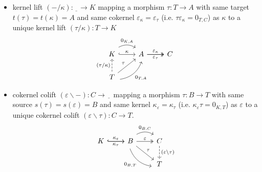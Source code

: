\begin{itemize}
\item kernel lift $(-/\kappa) : \underline{\phantom{T}} \rightarrow K$ mapping a morphism $\tau : T \rightarrow A$ with same
target $t(\tau) = t(\kappa) = A$ and same cokernel $\varepsilon_{\kappa} = \varepsilon_{\tau}$ (i.e. $\tau\varepsilon_{\kappa} = 0_{T,C}$)
as $\kappa$ to a unique kernel lift $(\tau / \kappa) : T \rightarrow K$
\[
\begin{tikzcd}
K \arrow[r, "\kappa", hook] \arrow[r, "{0_{K,A}}", bend left, shift left=2]                                & A \arrow[r, "\varepsilon_{\kappa}", two heads] \arrow[r, "\varepsilon_{\tau}"', two heads] & C \\
T \arrow[ru, "{0_{T,A}}"', bend right, shift right=2] \arrow[ru, "\tau"] \arrow[u, "(\tau/\kappa)", dashed] &                                                                                            &  
\end{tikzcd}
\]
\item cokernel colift $(\varepsilon \backslash - ) : C \rightarrow \underline{\phantom{T}}$ mapping a morphism $\tau : B \rightarrow T$ with
same source $s(\tau) = s(\varepsilon) = B$ and same kernel $\kappa_{\varepsilon} = \kappa_{\tau}$
(i.e. $\kappa_{\varepsilon}\tau = 0_{K,T}$)  as $\varepsilon$ to a unique cokernel
colift $(\varepsilon \backslash \tau) : C \rightarrow T$.
\[
\begin{tikzcd}
K \arrow[r, "\kappa_{\varepsilon}", hook] \arrow[r, "\kappa_{\tau}"', hook] & B \arrow[r, "\varepsilon", two heads] \arrow[r, "{0_{B,C}}", bend left, shift left=2] \arrow[rd, "\tau"] \arrow[rd, "{0_{B,T}}"', bend right, shift right=2] & C \arrow[d, "(\varepsilon\backslash\tau)", dashed] \\
                                                                            &                                                                                                                                                   & T                                                 
\end{tikzcd}
\]
\end{itemize}


